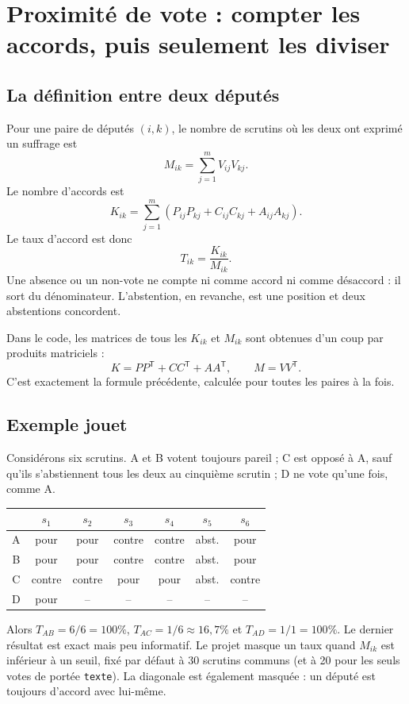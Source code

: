 \documentclass[11pt,a4paper]{article}
\newcommand{\code}[1]{\texttt{#1}}
\begin{document}
\section{Proximité de vote : compter les accords, puis seulement les diviser}

\subsection{La définition entre deux députés}

Pour une paire de députés $(i,k)$, le nombre de scrutins où les deux ont
exprimé un suffrage est
\[
 M_{ik}=\sum_{j=1}^{m}V_{ij}V_{kj}.
\]
Le nombre d'accords est
\[
 K_{ik}=\sum_{j=1}^{m}
 \left(P_{ij}P_{kj}+C_{ij}C_{kj}+A_{ij}A_{kj}\right).
\]
Le taux d'accord est donc
\[
 T_{ik}=\frac{K_{ik}}{M_{ik}}.
\]
Une absence ou un non-vote ne compte ni comme accord ni comme désaccord : il
sort du dénominateur. L'abstention, en revanche, est une position et deux
abstentions concordent.

Dans le code, les matrices de tous les $K_{ik}$ et $M_{ik}$ sont obtenues d'un
coup par produits matriciels :
\[
 K=PP^{\mathsf T}+CC^{\mathsf T}+AA^{\mathsf T},\qquad M=VV^{\mathsf T}.
\]
C'est exactement la formule précédente, calculée pour toutes les paires à la
fois.

\subsection{Exemple jouet}

Considérons six scrutins. A et B votent toujours pareil ; C est opposé à A,
sauf qu'ils s'abstiennent tous les deux au cinquième scrutin ; D ne vote qu'une
fois, comme A.

\begin{center}
\begin{tabular}{c*{6}{c}}
\toprule
 & $s_1$ & $s_2$ & $s_3$ & $s_4$ & $s_5$ & $s_6$ \\
\midrule
A & pour & pour & contre & contre & abst. & pour \\
B & pour & pour & contre & contre & abst. & pour \\
C & contre & contre & pour & pour & abst. & contre \\
D & pour & -- & -- & -- & -- & -- \\
\bottomrule
\end{tabular}
\end{center}

Alors $T_{AB}=6/6=100\%$, $T_{AC}=1/6\approx16{,}7\%$ et
$T_{AD}=1/1=100\%$. Le dernier résultat est exact mais peu informatif. Le
projet masque un taux quand $M_{ik}$ est inférieur à un seuil, fixé par défaut
à 30 scrutins communs (et à 20 pour les seuls votes de portée \code{texte}).
La diagonale est également masquée : un député est toujours d'accord avec lui-même.
\end{document}
